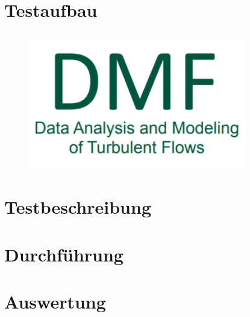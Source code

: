 \documentclass{article}%
\title{}%
\author{}%
\date{2023{-}08{-}21}%
\begin{document}
%
\normalsize%
\maketitle%
\newpage%
\tableofcontents%
\newpage%
\section{Testaufbau}%
\label{sec:Testaufbau}%

%
\subsection{}%
\label{subsec:}%

%


\begin{figure}[h!]%
\centering%
\includegraphics[width=360px]{imgta0_0.png}%
\caption{}%
\end{figure}

%
\newpage%
\section{Testbeschreibung}%
\label{sec:Testbeschreibung}%

%
\newpage%
\section{Durchführung}%
\label{sec:Durchfhrung}%

%
\newpage%
\section{Auswertung}%
\label{sec:Auswertung}%

%
\newpage%
\end{document}

